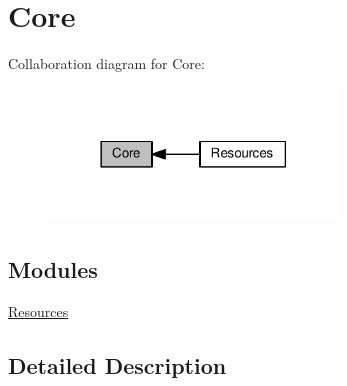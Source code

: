 \hypertarget{group___core}{}\section{Core}
\label{group___core}
Collaboration diagram for Core\+:\nopagebreak
\begin{figure}[H]
\begin{center}
\leavevmode
\includegraphics[width=218pt]{group___core}
\end{center}
\end{figure}
\subsection*{Modules}
\begin{DoxyCompactItemize}
\item 
\hyperlink{group___resources}{Resources}
\end{DoxyCompactItemize}


\subsection{Detailed Description}
